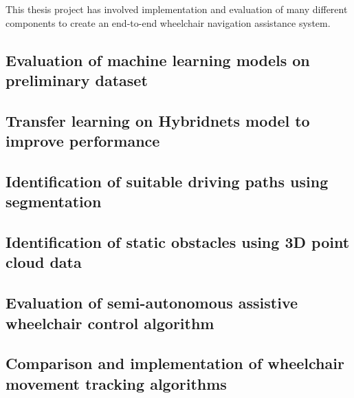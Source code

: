 This thesis project has involved implementation and evaluation
of many different components to create an end-to-end wheelchair
navigation assistance system.

\subsection{Evaluation of machine learning models on preliminary dataset}

\subsection{Transfer learning on Hybridnets model to improve performance}

\subsection{Identification of suitable driving paths using segmentation}

\subsection{Identification of static obstacles using 3D point cloud data}

\subsection{Evaluation of semi-autonomous assistive wheelchair control algorithm}

\subsection{Comparison and implementation of wheelchair movement tracking algorithms}
